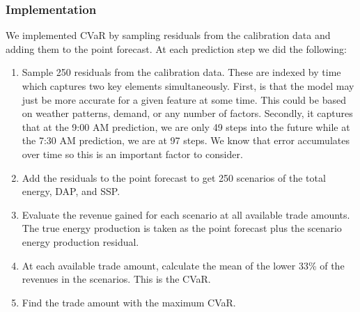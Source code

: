 \documentclass[
  journal,
]{IEEEtran}%
\providecommand{\tightlist}{%
  \setlength{\itemsep}{0pt}\setlength{\parskip}{0pt}}\usepackage{longtable,booktabs,array}
\begin{document}
\subsubsection{Implementation}\label{implementation-1}

We implemented CVaR by sampling residuals from the calibration data and
adding them to the point forecast. At each prediction step we did the
following:

\begin{enumerate}
\def\labelenumi{\arabic{enumi}.}
\tightlist
\item
  Sample 250 residuals from the calibration data. These are indexed by
  time which captures two key elements simultaneously. First, is that
  the model may just be more accurate for a given feature at some time.
  This could be based on weather patterns, demand, or any number of
  factors. Secondly, it captures that at the 9:00 AM prediction, we are
  only 49 steps into the future while at the 7:30 AM prediction, we are
  at 97 steps. We know that error accumulates over time so this is an
  important factor to consider.
\item
  Add the residuals to the point forecast to get 250 scenarios of the
  total energy, DAP, and SSP.
\item
  Evaluate the revenue gained for each scenario at all available trade
  amounts. The true energy production is taken as the point forecast
  plus the scenario energy production residual.
\item
  At each available trade amount, calculate the mean of the lower 33\%
  of the revenues in the scenarios. This is the CVaR.
\item
  Find the trade amount with the maximum CVaR.
\end{enumerate}
\end{document}

